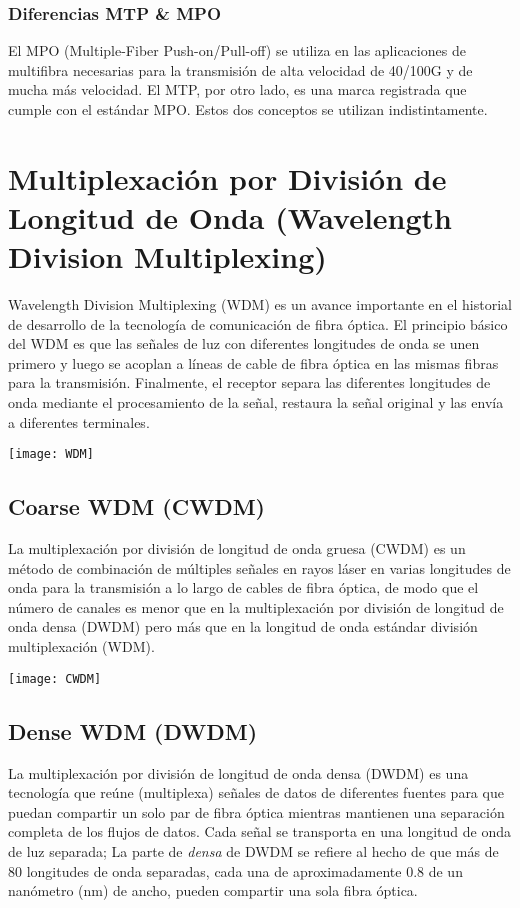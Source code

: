 \subsubsection*{Diferencias MTP \& MPO}
El MPO (Multiple-Fiber Push-on/Pull-off) se utiliza en las aplicaciones de multifibra necesarias para la transmisión de alta velocidad de 40/100G y de mucha más velocidad. El MTP, por otro lado, es una marca registrada que cumple con el estándar MPO. Estos dos conceptos se utilizan indistintamente.

\section{Multiplexación por División de Longitud de Onda (Wavelength Division Multiplexing)}
Wavelength Division Multiplexing (WDM) es un avance importante en el historial de desarrollo de la tecnología de comunicación de fibra óptica. El principio básico del WDM es que las señales de luz con diferentes longitudes de onda se unen primero y luego se acoplan a líneas de cable de fibra óptica en las mismas fibras para la transmisión. Finalmente, el receptor separa las diferentes longitudes de onda mediante el procesamiento de la señal, restaura la señal original y las envía a diferentes terminales.
\begin{center}
\texttt{[image: WDM]}
\end{center}
\subsection{Coarse WDM (CWDM)}
La multiplexación por división de longitud de onda gruesa (CWDM) es un método de combinación de múltiples señales en rayos láser en varias longitudes de onda para la transmisión a lo largo de cables de fibra óptica, de modo que el número de canales es menor que en la multiplexación por división de longitud de onda densa (DWDM) pero más que en la longitud de onda estándar división multiplexación (WDM).
\begin{center}
\texttt{[image: CWDM]}
\end{center}
\subsection{Dense WDM (DWDM)}
La multiplexación por división de longitud de onda densa (DWDM) es una tecnología que reúne (multiplexa) señales de datos de diferentes fuentes para que puedan compartir un solo par de fibra óptica mientras mantienen una separación completa de los flujos de datos. Cada señal se transporta en una longitud de onda de luz separada; La parte de \textit{densa} de DWDM se refiere al hecho de que más de 80 longitudes de onda separadas, cada una de aproximadamente 0.8 de un nanómetro (nm) de ancho, pueden compartir una sola fibra óptica.

